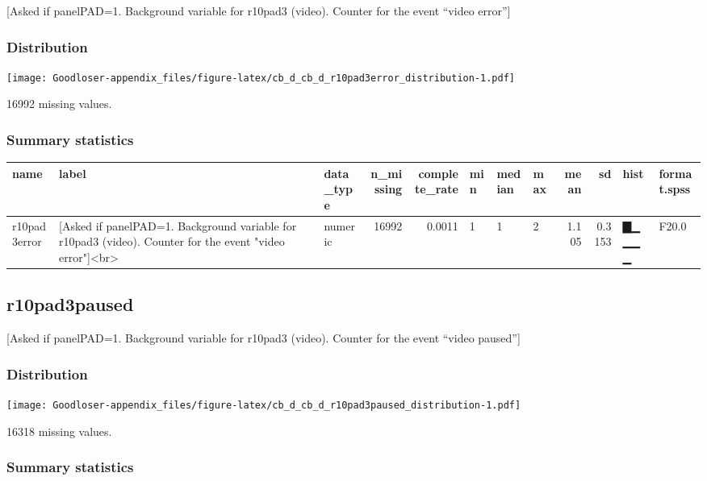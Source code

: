 \documentclass[
]{book}
\begin{document}
{[}Asked if panelPAD=1. Background variable for r10pad3 (video). Counter for the event ``video error''{]}

\hypertarget{r10pad3error_distribution}{%
\subsubsection{Distribution}\label{r10pad3error_distribution}}

\texttt{[image: Goodloser-appendix\_files/figure-latex/cb\_d\_cb\_d\_r10pad3error\_distribution-1.pdf]}

16992 missing values.

\hypertarget{r10pad3error_summary}{%
\subsubsection{Summary statistics}\label{r10pad3error_summary}}

\begin{tabular}{l|l|l|r|r|l|l|l|r|r|l|l}
\hline
name & label & data_type & n_missing & complete_rate & min & median & max & mean & sd & hist & format.spss\\
\hline
r10pad3error & [Asked if panelPAD=1. Background variable for r10pad3 (video). Counter for the event "video error"]<br> & numeric & 16992 & 0.0011 & 1 & 1 & 2 & 1.105 & 0.3153 & ▇▁▁▁▁ & F20.0\\
\hline
\end{tabular}

\hypertarget{r10pad3paused}{%
\subsection{r10pad3paused}\label{r10pad3paused}}

{[}Asked if panelPAD=1. Background variable for r10pad3 (video). Counter for the event ``video paused''{]}

\hypertarget{r10pad3paused_distribution}{%
\subsubsection{Distribution}\label{r10pad3paused_distribution}}

\texttt{[image: Goodloser-appendix\_files/figure-latex/cb\_d\_cb\_d\_r10pad3paused\_distribution-1.pdf]}

16318 missing values.

\hypertarget{r10pad3paused_summary}{%
\subsubsection{Summary statistics}\label{r10pad3paused_summary}}
\end{document}
